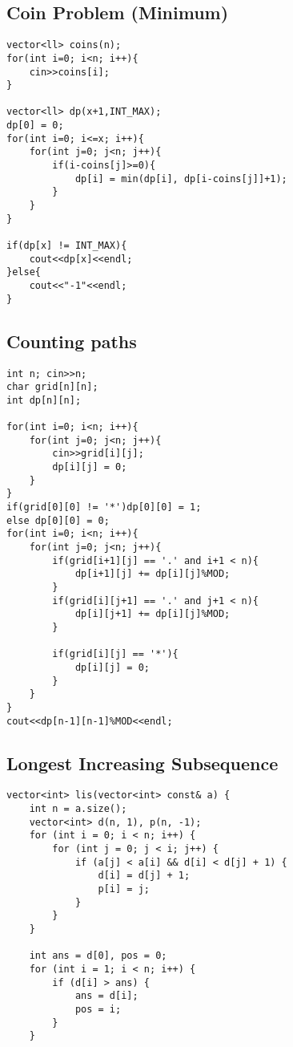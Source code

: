 \documentclass[10pt]{article}
\begin{document}
\begin{multicols*}{2}
\subsection{Coin Problem (Minimum)}

\begin{lstlisting}[style=compactcpp]
vector<ll> coins(n);
for(int i=0; i<n; i++){
    cin>>coins[i];
}
    
vector<ll> dp(x+1,INT_MAX);
dp[0] = 0;
for(int i=0; i<=x; i++){
    for(int j=0; j<n; j++){
        if(i-coins[j]>=0){
            dp[i] = min(dp[i], dp[i-coins[j]]+1);
        }
    }
}
    
if(dp[x] != INT_MAX){
    cout<<dp[x]<<endl;
}else{
    cout<<"-1"<<endl;
}
\end{lstlisting}

\subsection{Counting paths}

\begin{lstlisting}[style=compactcpp]
int n; cin>>n;
char grid[n][n];
int dp[n][n];
    
for(int i=0; i<n; i++){
    for(int j=0; j<n; j++){
        cin>>grid[i][j];
        dp[i][j] = 0;
    }
}
if(grid[0][0] != '*')dp[0][0] = 1;
else dp[0][0] = 0;
for(int i=0; i<n; i++){
    for(int j=0; j<n; j++){
        if(grid[i+1][j] == '.' and i+1 < n){
            dp[i+1][j] += dp[i][j]%MOD;
        }   
        if(grid[i][j+1] == '.' and j+1 < n){
            dp[i][j+1] += dp[i][j]%MOD;
        }

        if(grid[i][j] == '*'){
            dp[i][j] = 0;
        }
    }
}
cout<<dp[n-1][n-1]%MOD<<endl;
\end{lstlisting}

\subsection{Longest Increasing Subsequence}

\begin{lstlisting}[style=compactcpp]
vector<int> lis(vector<int> const& a) {
    int n = a.size();
    vector<int> d(n, 1), p(n, -1);
    for (int i = 0; i < n; i++) {
        for (int j = 0; j < i; j++) {
            if (a[j] < a[i] && d[i] < d[j] + 1) {
                d[i] = d[j] + 1;
                p[i] = j;
            }
        }
    }

    int ans = d[0], pos = 0;
    for (int i = 1; i < n; i++) {
        if (d[i] > ans) {
            ans = d[i];
            pos = i;
        }
    }


\end{lstlisting}
\end{multicols*}
\end{document}
